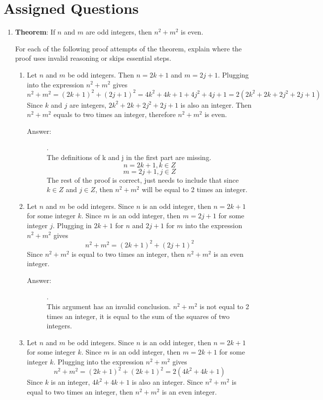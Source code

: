 \documentclass[12pt, oneside]{article}
\begin{document}
\section*{Assigned Questions}
\begin{enumerate}

\item \textbf{Theorem}: If $n$ and $m$ are odd integers, then $n^2+m^2$ is even. 

For each of the following proof attempts of the theorem, explain where the proof uses invalid reasoning or skips essential steps.
\begin{enumerate}
    \item Let $n$ and $m$ be odd integers. Then $n=2k+1$ and $m=2j+1$. Plugging into the expression $n^2+m^2$ gives
    \[n^2+m^2=(2k+1)^2+(2j+1)^2=4k^2+4k+1+4j^2+4j+1=2(2k^2+2k+2j^2+2j+1)\]
    Since $k$ and $j$ are integers, $2k^2+2k+2j^2+2j+1$ is also an integer. Then $n^2+m^2$ equals to two times an integer, therefore $n^2+m^2$ is even.
    
    \begin{description}
        \item[Answer:].\\
        The definitions of k and j in the first part are missing.\\
        $$ n = 2k + 1, k \in Z $$
        $$ m = 2j + 1, j \in Z $$
        The rest of the proof is correct, just needs to include that since $k \in Z$ and $j \in Z$, then $n^2+m^2$ will be equal to 2 times an integer.
    \end{description}

    \item Let $n$ and $m$ be odd integers. Since $n$ is an odd integer, then $n = 2k+1$ for some integer $k$. Since $m$ is an odd integer, then $m = 2j+1$ for some integer $j$. Plugging in $2k+1$ for $n$ and $2j+1$ for $m$ into the expression $n^2 + m^2$ gives
    \[n^2+m^2=(2k+1)^2+(2j+1)^2\]
    Since $n^2 + m^2$ is equal to two times an integer, then $n^2 + m^2$ is an even integer.
    
    \begin{description}
        \item[Answer:].\\
        This argument has an invalid conclusion. $n^2 + m^2$ is not equal to 2 times an integer, it is equal to the sum of the squares of two integers.
    \end{description}
    
    \item Let $n$ and $m$ be odd integers. Since $n$ is an odd integer, then $n = 2k+1$ for some integer $k$. Since $m$ is an odd integer, then $m = 2k+1$ for some integer $k$. Plugging into the expression $n^2 + m^2$ gives
    \[n^2+m^2=(2k+1)^2+(2k+1)^2=2(4k^2+4k+1)\]
    Since $k$ is an integer, $4k^2+4k+1$ is also an integer. Since $n^2 + m^2$ is equal to two times an integer, then $n^2 + m^2$ is an even integer.


\end{enumerate}
\end{enumerate}
\end{document}
